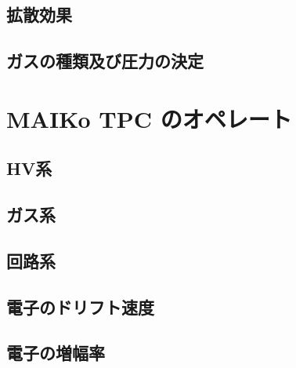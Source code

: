 \subsection{拡散効果}

\subsection{ガスの種類及び圧力の決定}

\section{MAIKo TPC のオペレート}
\subsection{HV系}
\subsection{ガス系}
\subsection{回路系}
\subsection{電子のドリフト速度}
\subsection{電子の増幅率}


%
%
